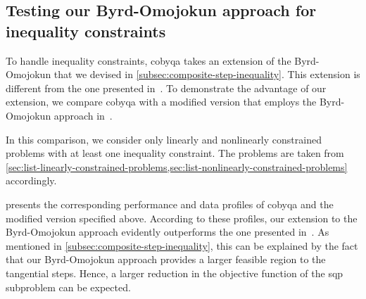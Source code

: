 \subsection{Testing our Byrd-Omojokun approach for inequality constraints}
\label{subsec:perf-byrd-omojokun}

To handle inequality constraints, \gls{cobyqa} takes an extension of the Byrd-Omojokun that we devised in \cref{subsec:composite-step-inequality}.
This extension is different from the one presented in~\cite[\S~15.4.4]{Conn_Gould_Toint_2000}.
To demonstrate the advantage of our extension, we compare \gls{cobyqa} with a modified version that employs the Byrd-Omojokun approach in~\cite[\S~15.4.4]{Conn_Gould_Toint_2000}.

In this comparison, we consider only linearly and nonlinearly constrained problems with at least one inequality constraint.
The problems are taken from \cref{sec:list-linearly-constrained-problems,sec:list-nonlinearly-constrained-problems} accordingly.

 presents the corresponding performance and data profiles of \gls{cobyqa} and the modified version specified above.
According to these profiles, our extension to the Byrd-Omojokun approach evidently outperforms the one presented in~\cite[\S~15.4.4]{Conn_Gould_Toint_2000}.
As mentioned in \cref{subsec:composite-step-inequality}, this can be explained by the fact that our Byrd-Omojokun approach provides a larger feasible region to the tangential steps.
Hence, a larger reduction in the objective function of the \gls{sqp} subproblem can be expected.

